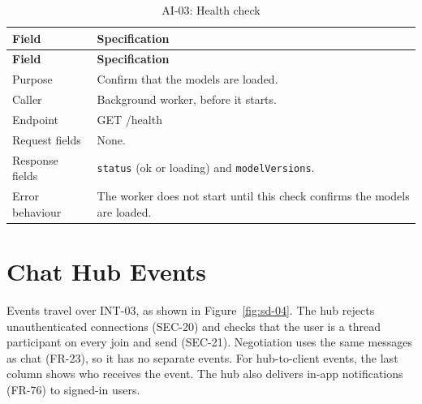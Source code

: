 {\begin{longtable}{@{}>{\raggedright\arraybackslash}p{}>{\raggedright\arraybackslash}p{}@{}}
\caption{AI-03: Health check}\label{tab:ai-health}\\
\toprule
\textbf{Field} & \textbf{Specification} \\
\midrule
\endfirsthead
\toprule
\textbf{Field} & \textbf{Specification} \\
\midrule
\endhead
Purpose & Confirm that the models are loaded. \\
Caller & Background worker, before it starts. \\
Endpoint & GET /health \\
Request fields & None. \\
Response fields & \texttt{status} (ok or loading) and \texttt{modelVersions}. \\
Error behaviour & The worker does not start until this check confirms the models are loaded. \\
\bottomrule
\end{longtable}
}

\section{Chat Hub Events}
\label{sec:chat-hub-events}
Events travel over INT-03, as shown in Figure~\ref{fig:sd-04}. The hub rejects
unauthenticated connections (SEC-20) and checks that the user is a thread participant
on every join and send (SEC-21). Negotiation uses the same messages as chat
(FR-23), so it has no separate events. For hub-to-client events, the last column
shows who receives the event. The hub also delivers in-app notifications (FR-76) to signed-in users.

